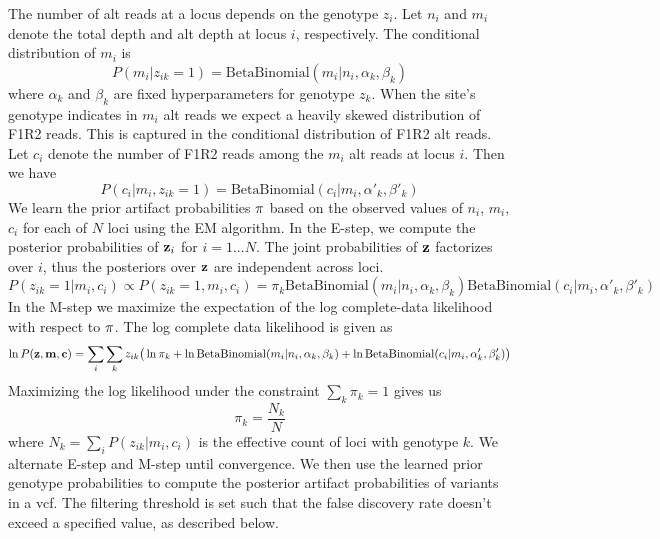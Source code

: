 \documentclass[nofootinbib,amssymb,amsmath]{revtex4}
\newcommand{\vc}{{\bf c}}
\newcommand{\vz}{{\bf z}}
\newcommand{\vm}{{\bf m}}
\newcommand{\vpi}{{\bf \pi}}
\begin{document}
The number of alt reads at a locus depends on the genotype $z_i$. Let $n_i$ and $m_i$ denote the total depth and alt depth at locus $i$, respectively. The conditional distribution of $m_i$ is
\begin{equation}
P(m_i | z_{ik} = 1) = \mathrm{BetaBinomial}(m_i | n_i, \alpha_k, \beta_k)
\end{equation}
where $\alpha_k$ and $\beta_k$ are fixed hyperparameters for genotype $z_k$. When the site's genotype indicates in $m_i$ alt reads we expect a heavily skewed distribution of F1R2 reads. This is captured in the conditional distribution of F1R2 alt reads. Let $c_i$ denote the number of F1R2 reads among the $m_i$ alt reads at locus $i$. Then we have
\begin{equation}
P(c_i | m_i, z_{ik} = 1) = \mathrm{BetaBinomial}( c_i | m_i, \alpha'_k, \beta'_k)
\end{equation}
We learn the prior artifact probabilities $\vpi$ based on the observed values of $n_i$, $m_i$, $c_i$ for each of $N$ loci using the EM algorithm. In the E-step, we compute the posterior probabilities of $\vz_i$ for $i = 1 ... N$. The joint probabilities of $\vz$ factorizes over $i$, thus the posteriors over $\vz$ are independent across loci. 
\begin{equation}
P(z_{ik} = 1 | m_i, c_i) \propto P(z_{ik} = 1, m_i, c_i) = \pi_{k} \mathrm{BetaBinomial}(m_i | n_i, \alpha_k, \beta_k)  \mathrm{BetaBinomial}( c_i | m_i, \alpha'_k, \beta'_k)
\end{equation}
In the M-step we maximize the expectation of the log complete-data likelihood with respect to $\vpi$. The log complete data likelihood is given as
\begin{equation}
\ln P(\vz, \vm, \vc) = \sum_i \sum_k z_{ik} \big( \ln \pi_{k} + \ln \mathrm{BetaBinomial} ( m_i | n_i, \alpha_k, \beta_k)  + \ln \mathrm{BetaBinomial}( c_i | m_i, \alpha'_k, \beta'_k) \big)
\end{equation}
Maximizing the log likelihood under the constraint $\sum_k \pi_k = 1$ gives us
\begin{equation}
\pi_k = \frac{N_k}{N}
\end{equation}
where $N_k = \sum_i P(z_{ik} | m_i, c_i)$ is the effective count of loci with genotype $k$. We alternate E-step and M-step until convergence. We then use the learned prior genotype probabilities to compute the posterior artifact probabilities of variants in a vcf. The filtering threshold is set such that the false discovery rate doesn't exceed a specified value, as described below.
\end{document}
